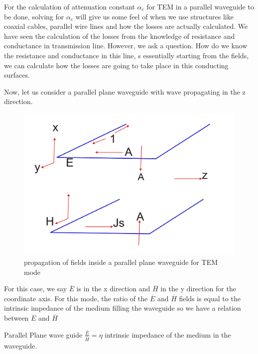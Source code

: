 For the calculation of  attenuation constant $\alpha_c$   for TEM in a parallel waveguide to be done, solving for $\alpha_c$  will give us some feel of when we use structures like coaxial cables, parallel wire lines and how the losses are actually calculated. We have seen the calculation of the losses from the knowledge of resistance and conductance in transmission line. However, we ask a question. How do we know the resistance and conductance in this line, s essentially starting from the fields, we can calculate how the losses are going to take place in this conducting surfaces.

Now, let us consider a parallel plane waveguide with wave propagating in the z direction.
\begin{figure}[h]
\centering
\includegraphics[scale=0.45]{./graphics/lecture2-image-b.png}
\caption{propagation of fields inside a parallel plane waveguide for TEM mode}
\end{figure}
For this case, we say $\overline{E}$ is in the x direction and $\overline{H}$  in the y direction for the coordinate axis. For this mode, the ratio of the $\overline{E}$ and  $\overline{H}$ fields is equal to the intrinsic impedance of the medium filling the waveguide so we have a relation between $\overline{E}$ and  $\overline{H}$

Parallel Plane wave guide $\frac{\overline{E}}{\overline{H}} = \eta $ intrinsic impedance of the medium in the waveguide.

